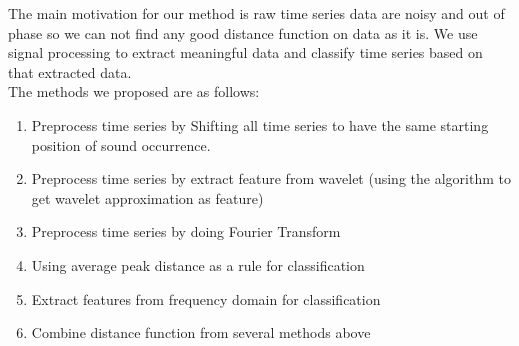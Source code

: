 The main motivation for our method is raw time series data are noisy and out of phase so we can not find any good distance function on data as it is. We use signal processing to extract meaningful data and classify time series based on that extracted data.\\

The methods we proposed are as follows:
\begin{enumerate}
\item Preprocess time series by Shifting all time series to have the same starting position of sound occurrence.
\item Preprocess time series by extract feature from wavelet (using the algorithm to get wavelet approximation as feature)
\item Preprocess time series by doing Fourier Transform
\item Using average peak distance as a rule for classification
\item Extract features from frequency domain for classification
\item Combine distance function from several methods above
\end{enumerate}

